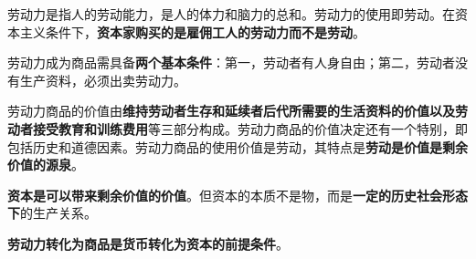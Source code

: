 劳动力是指人的劳动能力，是人的体力和脑力的总和。劳动力的使用即劳动。在资本主义条件下，\textbf{资本家购买的是雇佣工人的劳动力而不是劳动}。

{劳动力成为商品需具备}\textbf{{两个基本条件}}{：第一，劳动者有人身自由；第二，劳动者没有生产资料，必须出卖劳动力。}

{劳动力商品的价值由}\textbf{维持劳动者生存和延续者后代所需要的生活资料的价值以及劳动者接受教育和训练费用}等三部分{构成。劳动力商品的价值决定还有一个特别，即包括历史和道德因素。}劳动力商品的使用价值是劳动，其特点是\textbf{劳动是价值是剩余价值的源泉}{。}

\textbf{资本是可以带来剩余价值的价值}{。但}资本的本质不是物，而是\textbf{一定的历史社会形态下}的生产关系{。}

\textbf{{劳动力转化为商品}是货币转化为资本的前提条件}{。}
